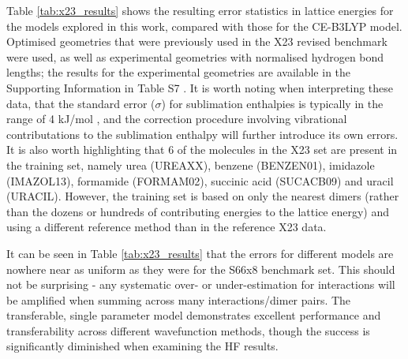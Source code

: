 \documentclass[preprint]{iucr}              %
\begin{document}
Table \ref{tab:x23_results} shows the resulting error statistics in lattice energies for the models explored in this work,
compared with those for the CE-B3LYP model. Optimised geometries that were previously used in the X23 revised
benchmark \cite{Dolgonos2019} were used, as well as experimental geometries with normalised hydrogen bond lengths;
the results for the experimental geometries are available in the Supporting Information in Table S7 %
.
It is worth noting when interpreting these data, that the standard error ($\sigma$) for sublimation enthalpies is typically in the range of
4 kJ/mol \cite{Chickos2003}, and the correction procedure involving vibrational contributations to the sublimation enthalpy will further introduce
its own errors.
It is also worth highlighting that 6 of the molecules in the X23 set are present in the training set,
namely urea (UREAXX), benzene (BENZEN01), imidazole (IMAZOL13), formamide (FORMAM02), succinic acid (SUCACB09) and uracil (URACIL). However,
the training set is based on only the nearest dimers (rather than the dozens or hundreds of contributing energies to the lattice energy) 
and using a different reference method than in the reference X23 data. 

It can be seen in Table \ref{tab:x23_results} that the errors for different models are nowhere near as uniform as they were for the S66x8 benchmark set.
This should not be surprising - any systematic over- or under-estimation for interactions will be amplified when summing across many interactions/dimer pairs. The transferable, single parameter model demonstrates excellent performance and transferability across different wavefunction methods, though the success is
significantly diminished when examining the HF results.
\end{document}

